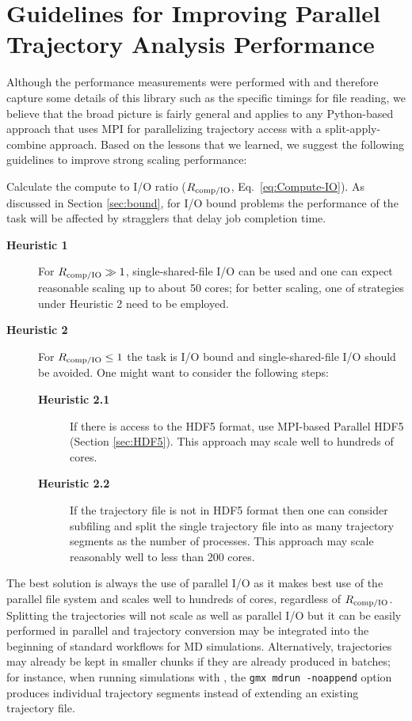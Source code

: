 
\section{Guidelines for Improving Parallel Trajectory Analysis Performance}
\label{sec:guidelines}

Although the performance measurements were performed with  and therefore capture some details of this library such as the specific timings for file reading, we believe that the broad picture is fairly general and applies to any Python-based approach that uses MPI for parallelizing trajectory access with a split-apply-combine approach.
Based on the lessons that we learned, we suggest the following guidelines to improve strong scaling performance:

Calculate the compute to I/O ratio ($R_{\text{comp/IO}}$, Eq.~\ref{eq:Compute-IO}). As discussed in Section \ref{sec:bound}, for I/O bound problems the performance of the task will be affected by stragglers that delay job completion time.
\begin{description}
\item[\textbf{Heuristic 1}] For $R_{\text{comp/IO}} \gg 1$, single-shared-file I/O can be used and one can expect reasonable scaling up to about 50 cores; for better scaling, one of strategies under Heuristic 2 need to be employed.
\item[\textbf{Heuristic 2}] For $R_{\text{comp/IO}} \le 1$ the task is I/O bound and single-shared-file I/O should be avoided.
  One might want to consider the following steps:  
  \begin{description}
  \item[\textbf{Heuristic 2.1}] If there is access to the HDF5 format, use MPI-based Parallel HDF5 (Section \ref{sec:HDF5}). This approach may scale well to hundreds of cores.
  \item[\textbf{Heuristic 2.2}] If the trajectory file is not in HDF5 format then one can consider subfiling and split the single trajectory file into as many trajectory segments as the number of processes. This approach may scale reasonably well to less than 200 cores.
  \end{description}
\end{description}

The best solution is always the use of parallel I/O as it makes best use of the parallel file system and scales well to hundreds of cores, regardless of $R_{\text{comp/IO}}$. 
Splitting the trajectories will not scale as well as parallel I/O but it can be easily performed in parallel and trajectory conversion may be integrated into the beginning of standard workflows for MD simulations.  Alternatively, trajectories may already be kept in smaller chunks if they are already produced in batches; for instance, when running simulations with  \cite{Abraham:2015aa}, the \texttt{gmx mdrun -noappend} option produces individual trajectory segments instead of extending an existing trajectory file.
